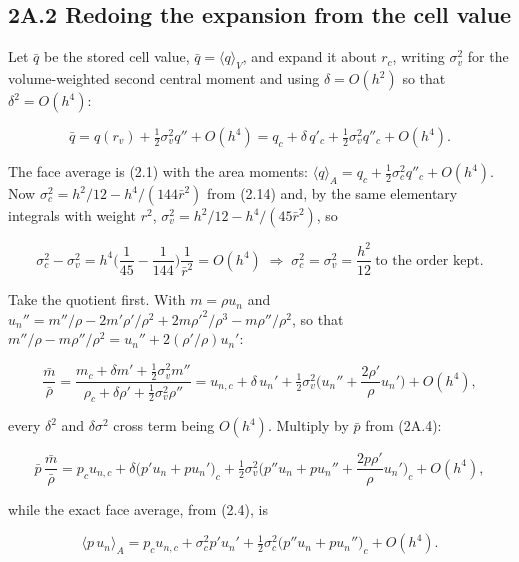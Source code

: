 \documentclass[11pt,a4paper]{article}
\begin{document}
\subsection*{2A.2 Redoing the expansion from the cell value}

Let $\bar q$ be the stored cell value, $\bar q=\langle q\rangle_V$, and expand
it about $r_c$, writing $\sigma_v^2$ for the volume-weighted second central
moment and using $\delta=O(h^2)$ so that $\delta^2=O(h^4)$:

\begin{equation*}
\bar q = q(r_v) + \tfrac12\sigma_v^2 q'' + O(h^4)
      = q_c + \delta\,q'_c + \tfrac12\sigma_v^2 q''_c + O(h^4).
\tag{2A.4}
\end{equation*}

The face average is (2.1) with the area moments:
$\langle q\rangle_A = q_c + \tfrac12\sigma_c^2 q''_c+O(h^4)$. Now
$\sigma_c^2 = h^2/12 - h^4/(144\bar r^2)$ from (2.14) and, by the same
elementary integrals with weight $r^2$,
$\sigma_v^2 = h^2/12 - h^4/(45\bar r^2)$, so

\begin{equation*}
\sigma_c^2-\sigma_v^2 = h^4\Big(\frac{1}{45}-\frac{1}{144}\Big)\frac{1}{\bar r^2}
= O(h^4) \;\Longrightarrow\;
\sigma_c^2=\sigma_v^2=\frac{h^2}{12}\ \text{to the order kept.}
\tag{2A.5}
\end{equation*}

Take the quotient first. With $m=\rho u_n$ and
$u_n''=m''/\rho-2m'\rho'/\rho^2+2m\rho'^2/\rho^3-m\rho''/\rho^2$, so that
$m''/\rho-m\rho''/\rho^2=u_n''+2(\rho'/\rho)u_n'$:

\begin{equation*}
\frac{\bar m}{\bar\rho}
=\frac{m_c+\delta m'+\tfrac12\sigma_v^2m''}{\rho_c+\delta\rho'+\tfrac12\sigma_v^2\rho''}
= u_{n,c} + \delta\,u_n' + \tfrac12\sigma_v^2\Big(u_n''+\frac{2\rho'}{\rho}u_n'\Big)+O(h^4),
\tag{2A.6}
\end{equation*}

every $\delta^2$ and $\delta\sigma^2$ cross term being $O(h^4)$. Multiply by
$\bar p$ from (2A.4):

\begin{equation*}
\bar p\,\frac{\bar m}{\bar\rho}
= p_cu_{n,c} + \delta\big(p'u_n+pu_n'\big)_c
+ \tfrac12\sigma_v^2\Big(p''u_n+pu_n''+\frac{2p\rho'}{\rho}u_n'\Big)_c+O(h^4),
\tag{2A.7}
\end{equation*}

while the exact face average, from (2.4), is

\begin{equation*}
\langle p\,u_n\rangle_A = p_cu_{n,c}+\sigma_c^2p'u_n'
+\tfrac12\sigma_c^2\big(p''u_n+pu_n''\big)_c+O(h^4).
\tag{2A.8}
\end{equation*}
\end{document}
